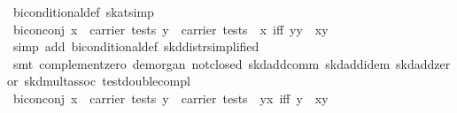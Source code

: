 \begin{isabellebody}
\ biconditional{}def\ {}skat{}simp{}\isanewline
\isanewline
{}\isamarkupfalse%
\ bicon{}conj{}{}\ {}{}x\ {}\ carrier\ tests{}\ y\ {}\ carrier\ tests{}\ {}\ {}x\ iff\ y{}{}y\ {}\ x{}y{}\isanewline
%
\isadelimproof
\ \ %
\endisadelimproof
%
\isatagproof
{}\isamarkupfalse%
\ {}simp\ add{}\ biconditional{}def\ skd{}distr{}simplified{}{}\isanewline
\ \ \isamarkupfalse%
\ {}smt\ complement{}zero\ de{}morgan{}\ not{}closed\ skd{}add{}comm\ skd{}add{}idem\ skd{}add{}zeror\ skd{}mult{}assoc\ test{}double{}compl{}%
\endisatagproof
{\isafoldproof}%
%
\isadelimproof
\isanewline
%
\endisadelimproof
\isanewline
{}\isamarkupfalse%
\ bicon{}conj{}{}\ {}{}x\ {}\ carrier\ tests{}\ y\ {}\ carrier\ tests{}\ {}\ y{}{}x\ iff\ y{}\ {}\ x{}y{}\isanewline

\end{isabellebody}
